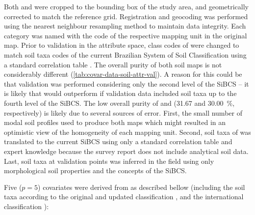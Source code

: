 Both \soilOld{} and \soilNew{} were cropped to the bounding box of the study area, and geometrically corrected 
to match the reference grid. Registration and geocoding was performed using the nearest neighbour resampling 
method to maintain data integrity. Each category was named with the code of the respective mapping unit in the 
original map. Prior to validation in the attribute space, class codes of \soilOld{} were changed to match soil 
taxa codes of the current Brazilian System of Soil Classification using a standard correlation table 
\cite{SantosEtAl2006}. The overall purity of both soil maps is not considerably different 
(\autoref{tab:covar-data-soil-attr-val}). A reason for this could be that validation was performed considering 
only the second level of the SiBCS -- it is likely that \soilNew{} would outperform \soilOld{} if validation 
data included soil taxa up to the fourth level of the SiBCS. The low overall purity of \soilOld{} and 
\soilNew{} (\num{31.67} and \SI{30.00}{\percent}, respectively) is likely due to several sources of error. 
First, the small number of modal soil profiles used to produce both maps which might resulted in an optimistic 
view of the homogeneity of each mapping unit. Second, soil taxa of \soilOld{} was translated to the current 
SiBCS using only a standard correlation table \cite{SantosEtAl2006} and expert knowledge because the survey 
report does not include analytical soil data. Last, soil taxa at validation points was inferred in the field 
using only morphological soil properties and the concepts of the SiBCS.

Five ($p = 5$) covariates were derived from \soilOld{} as described bellow (including the soil taxa according 
to the original and updated classification \cite{AzolinEtAl1988, SantosEtAl2013a}, and the international 
classification \cite{IUSSWorkingGroupWRB2007}):

